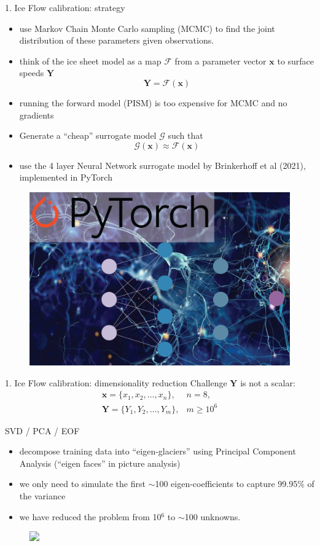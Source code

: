 \documentclass[hide notes,intlimits]{beamer}
\begin{document}
\begin{frame}{1. Ice Flow calibration: strategy}
\begin{itemize}
\item use Markov Chain Monte Carlo sampling (MCMC) to find the joint distribution of these parameters given observations.
\item think of the ice sheet model as a map $\mathcal{F}$ from a parameter vector $\mathbf{x}$ to surface speeds $\mathbf{Y}$
\begin{equation*}
\mathbf{Y} = \mathcal{F}(\mathbf{x})
\end{equation*}
\item running the forward model (PISM) is too expensive for MCMC and no gradients
\item Generate a ``cheap'' surrogate model $\mathcal{G}$ such that
\begin{equation*}
\mathcal{G}(\mathbf{x}) \approx \mathcal{F}(\mathbf{x})
\end{equation*}
\item use the 4 layer Neural Network surrogate model by Brinkerhoff et al (2021), implemented in PyTorch
\end{itemize}
  \begin{figure}
    \includegraphics[width=.25\textwidth]{neural-network}
  \end{figure}
\end{frame}



\begin{frame}{1. Ice Flow calibration: dimensionality reduction}
  \alert{Challenge $\mathbf{Y}$ is not a scalar}:
\begin{eqnarray*}
\mathbf{x} = \{x_1, x_2,\ldots,x_n\}, & n = 8, \\ 
\mathbf{Y} = \{Y_1, Y_2, \ldots,Y_m \},& m \ge 10^6
\end{eqnarray*}
\vspace{-1.5em}
\begin{block}{SVD / PCA / EOF}
\begin{itemize}
\item decompose training data into ``eigen-glaciers'' using Principal Component Analysis (``eigen faces'' in picture analysis)
\item we only need to simulate the first $\sim$100 eigen-coefficients to capture 99.95\% of the variance
\item we have reduced the problem from 10$^6$ to $\sim$100 unknowns.
\end{itemize}
\vspace{-0.5em}
\end{block}
\begin{figure}
  \includegraphics<1->[height=6cm]{eigenglaciers_0}
\end{figure}
\end{frame}
\end{document}
